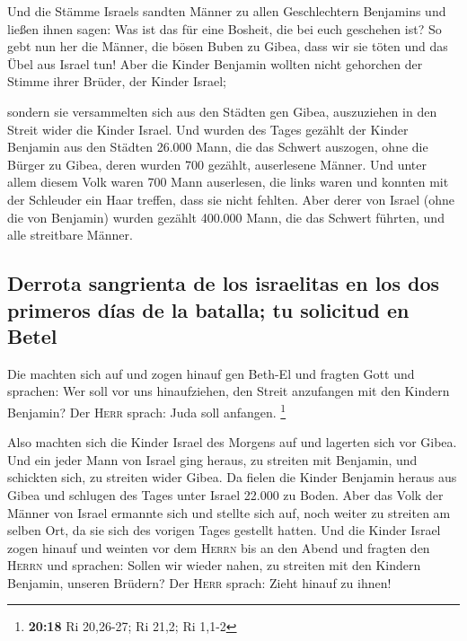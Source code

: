  Und die Stämme Israels sandten Männer zu allen
Geschlechtern Benjamins und ließen ihnen sagen: Was ist das für eine
Bosheit, die bei euch geschehen ist?  So gebt nun her die
Männer, die bösen Buben zu Gibea, dass wir sie töten und das Übel aus
Israel tun! Aber die Kinder Benjamin wollten nicht gehorchen der Stimme
ihrer Brüder, der Kinder Israel;

 sondern sie versammelten sich aus den Städten gen Gibea,
auszuziehen in den Streit wider die Kinder Israel.  Und
wurden des Tages gezählt der Kinder Benjamin aus den Städten 26.000
Mann, die das Schwert auszogen, ohne die Bürger zu Gibea, deren wurden
700 gezählt, auserlesene Männer.  Und unter allem diesem
Volk waren 700 Mann auserlesen, die links waren und konnten mit der
Schleuder ein Haar treffen, dass sie nicht fehlten.  Aber
derer von Israel (ohne die von Benjamin) wurden gezählt 400.000 Mann,
die das Schwert führten, und alle streitbare Männer.

\hypertarget{derrota-sangrienta-de-los-israelitas-en-los-dos-primeros-duxedas-de-la-batalla-tu-solicitud-en-betel}{%
\subsection{Derrota sangrienta de los israelitas en los dos primeros
días de la batalla; tu solicitud en
Betel}\label{derrota-sangrienta-de-los-israelitas-en-los-dos-primeros-duxedas-de-la-batalla-tu-solicitud-en-betel}}

 Die machten sich auf und zogen hinauf gen Beth-El und
fragten Gott und sprachen: Wer soll vor uns hinaufziehen, den Streit
anzufangen mit den Kindern Benjamin? Der \textsc{Herr} sprach: Juda soll
anfangen. \footnote{\textbf{20:18} Ri 20,26-27; Ri 21,2; Ri 1,1-2}

 Also machten sich die Kinder Israel des Morgens auf und
lagerten sich vor Gibea.  Und ein jeder Mann von Israel
ging heraus, zu streiten mit Benjamin, und schickten sich, zu streiten
wider Gibea.  Da fielen die Kinder Benjamin heraus aus
Gibea und schlugen des Tages unter Israel 22.000 zu Boden.
 Aber das Volk der Männer von Israel ermannte sich und
stellte sich auf, noch weiter zu streiten am selben Ort, da sie sich des
vorigen Tages gestellt hatten.  Und die Kinder Israel
zogen hinauf und weinten vor dem \textsc{Herrn} bis an den Abend und
fragten den \textsc{Herrn} und sprachen: Sollen wir wieder nahen, zu
streiten mit den Kindern Benjamin, unseren Brüdern? Der \textsc{Herr}
sprach: Zieht hinauf zu ihnen!

